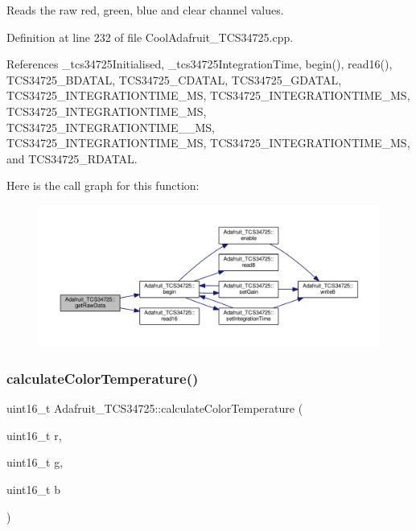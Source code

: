 Reads the raw red, green, blue and clear channel values. 



Definition at line 232 of file Cool\+Adafruit\+\_\+\+T\+C\+S34725.\+cpp.



References \+\_\+tcs34725\+Initialised, \+\_\+tcs34725\+Integration\+Time, begin(), read16(), T\+C\+S34725\+\_\+\+B\+D\+A\+T\+AL, T\+C\+S34725\+\_\+\+C\+D\+A\+T\+AL, T\+C\+S34725\+\_\+\+G\+D\+A\+T\+AL, T\+C\+S34725\+\_\+\+I\+N\+T\+E\+G\+R\+A\+T\+I\+O\+N\+T\+I\+M\+E\+\_\+MS, T\+C\+S34725\+\_\+\+I\+N\+T\+E\+G\+R\+A\+T\+I\+O\+N\+T\+I\+M\+E\+\_\+MS, T\+C\+S34725\+\_\+\+I\+N\+T\+E\+G\+R\+A\+T\+I\+O\+N\+T\+I\+M\+E\+\_\+MS, T\+C\+S34725\+\_\+\+I\+N\+T\+E\+G\+R\+A\+T\+I\+O\+N\+T\+I\+M\+E\+\_\+\_\+MS, T\+C\+S34725\+\_\+\+I\+N\+T\+E\+G\+R\+A\+T\+I\+O\+N\+T\+I\+M\+E\+\_\+MS, T\+C\+S34725\+\_\+\+I\+N\+T\+E\+G\+R\+A\+T\+I\+O\+N\+T\+I\+M\+E\+\_\+MS, and T\+C\+S34725\+\_\+\+R\+D\+A\+T\+AL.

Here is the call graph for this function\+:\nopagebreak
\begin{figure}[H]
\begin{center}
\leavevmode
\includegraphics[width=350pt]{df/d54/class_adafruit___t_c_s34725_abd9946a9baab1e0c76248cfe1864ea27_cgraph}
\end{center}
\end{figure}
\mbox{\label{class_adafruit___t_c_s34725_a9c6c7ab8a84a47a65ff04a125bcfee92}} 
\subsubsection{\texorpdfstring{calculate\+Color\+Temperature()}{calculateColorTemperature()}}
{\footnotesize\ttfamily uint16\+\_\+t Adafruit\+\_\+\+T\+C\+S34725\+::calculate\+Color\+Temperature (\begin{DoxyParamCaption}\item[{uint16\+\_\+t}]{r,  }\item[{uint16\+\_\+t}]{g,  }\item[{uint16\+\_\+t}]{b }\end{DoxyParamCaption})}



